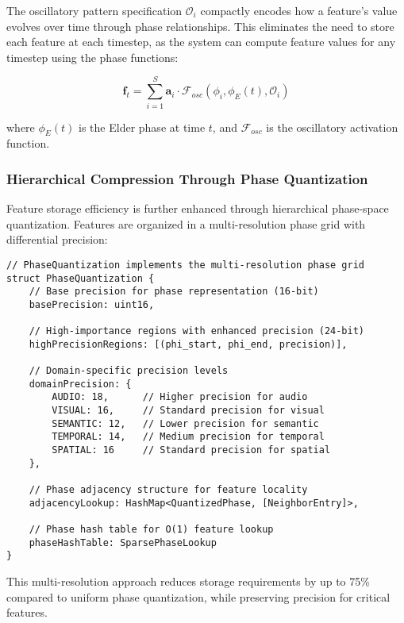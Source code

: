 The oscillatory pattern specification $\mathcal{O}_i$ compactly encodes how a feature's value evolves over time through phase relationships. This eliminates the need to store each feature at each timestep, as the system can compute feature values for any timestep using the phase functions:

\begin{equation}
\mathbf{f}_t = \sum_{i=1}^{S} \mathbf{a}_i \cdot \mathcal{F}_{osc}(\phi_i, \phi_E(t), \mathcal{O}_i)
\end{equation}

where $\phi_E(t)$ is the Elder phase at time $t$, and $\mathcal{F}_{osc}$ is the oscillatory activation function.

\subsubsection{Hierarchical Compression Through Phase Quantization}

Feature storage efficiency is further enhanced through hierarchical phase-space quantization. Features are organized in a multi-resolution phase grid with differential precision:

\begin{codeblock}[title=Hierarchical Phase Quantization]
\begin{verbatim}
// PhaseQuantization implements the multi-resolution phase grid
struct PhaseQuantization {
    // Base precision for phase representation (16-bit)
    basePrecision: uint16,
    
    // High-importance regions with enhanced precision (24-bit)
    highPrecisionRegions: [(phi_start, phi_end, precision)],
    
    // Domain-specific precision levels
    domainPrecision: {
        AUDIO: 18,      // Higher precision for audio
        VISUAL: 16,     // Standard precision for visual 
        SEMANTIC: 12,   // Lower precision for semantic
        TEMPORAL: 14,   // Medium precision for temporal
        SPATIAL: 16     // Standard precision for spatial
    },
    
    // Phase adjacency structure for feature locality
    adjacencyLookup: HashMap<QuantizedPhase, [NeighborEntry]>,
    
    // Phase hash table for O(1) feature lookup
    phaseHashTable: SparsePhaseLookup
}
\end{verbatim}
\end{codeblock}

This multi-resolution approach reduces storage requirements by up to 75\% compared to uniform phase quantization, while preserving precision for critical features.

